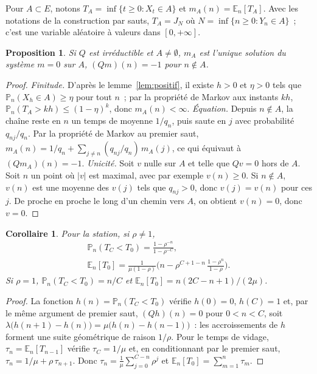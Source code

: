 \documentclass[10pt,a4paper,twocolumn]{article}
\theoremstyle{enonce}
\newtheorem{proposition}[theoreme]{Proposition}
\newtheorem{corollaire}[theoreme]{Corollaire}
\theoremstyle{defi}
\newcommand{\PP}{\mathbb{P}}
\newcommand{\EE}{\mathbb{E}}
\begin{document}
Pour $A\subset E$, notons $T_A=\inf\{t\geq0:X_t\in A\}$ et $m_A(n)=\EE_n[T_A]$. Avec les notations de la construction par sauts, $T_A=J_N$ où $N=\inf\{n\geq0:Y_n\in A\}$~; c'est une variable aléatoire à valeurs dans $[0,+\infty]$.

\begin{proposition}\label{prop:atteinte}
Si $Q$ est irréductible et $A\neq\emptyset$, $m_A$ est l'unique solution du système $m=0$ sur $A$, $(Qm)(n)=-1$ pour $n\notin A$.
\end{proposition}

\begin{proof}
\emph{Finitude.} D'après le lemme~\ref{lem:positif}, il existe $h>0$ et $\eta>0$ tels que $\PP_n(X_h\in A)\geq\eta$ pour tout $n$~; par la propriété de Markov aux instants $kh$, $\PP_n(T_A>kh)\leq(1-\eta)^k$, donc $m_A(n)<\infty$.
\emph{Équation.} Depuis $n\notin A$, la chaîne reste en $n$ un temps de moyenne $1/q_n$, puis saute en $j$ avec probabilité $q_{nj}/q_n$. Par la propriété de Markov au premier saut, $m_A(n)=1/q_n+\sum_{j\neq n}(q_{nj}/q_n)\,m_A(j)$, ce qui équivaut à $(Qm_A)(n)=-1$.
\emph{Unicité.} Soit $v$ nulle sur $A$ et telle que $Qv=0$ hors de $A$. Soit $n$ un point où $|v|$ est maximal, avec par exemple $v(n)\geq0$. Si $n\notin A$, $v(n)$ est une moyenne des $v(j)$ tels que $q_{nj}>0$, donc $v(j)=v(n)$ pour ces $j$. De proche en proche le long d'un chemin vers $A$, on obtient $v(n)=0$, donc $v=0$.
\end{proof}

\begin{corollaire}\label{cor:ruine}
Pour la station, si $\rho\neq1$,
\begin{gather*}
\PP_n(T_C<T_0)=\frac{1-\rho^{-n}}{1-\rho^{-C}},\\
\EE_n[T_0]=\frac{1}{\mu(1-\rho)}\Big(n-\rho^{C+1-n}\,\frac{1-\rho^n}{1-\rho}\Big).
\end{gather*}
Si $\rho=1$, $\PP_n(T_C<T_0)=n/C$ et $\EE_n[T_0]=n(2C-n+1)/(2\mu)$.
\end{corollaire}

\begin{proof}
La fonction $h(n)=\PP_n(T_C<T_0)$ vérifie $h(0)=0$, $h(C)=1$ et, par le même argument de premier saut, $(Qh)(n)=0$ pour $0<n<C$, soit $\lambda\big(h(n+1)-h(n)\big)=\mu\big(h(n)-h(n-1)\big)$~: les accroissements de $h$ forment une suite géométrique de raison $1/\rho$. Pour le temps de vidage, $\tau_n=\EE_n[T_{n-1}]$ vérifie $\tau_C=1/\mu$ et, en conditionnant par le premier saut, $\tau_n=1/\mu+\rho\,\tau_{n+1}$. Donc $\tau_n=\frac1\mu\sum_{j=0}^{C-n}\rho^j$ et $\EE_n[T_0]=\sum_{m=1}^n\tau_m$.
\end{proof}
\end{document}
